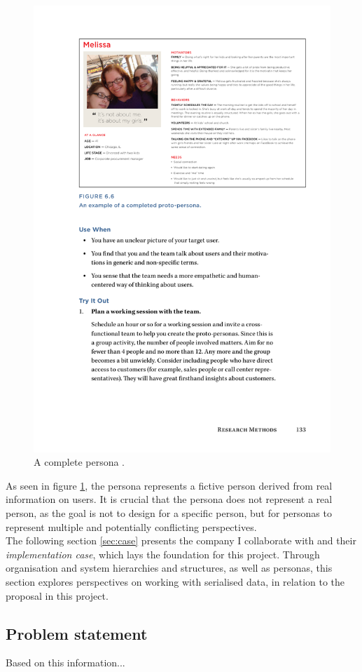 \documentclass[../report.tex]{subfiles}
\begin{document}
\begin{figure}[H]
\centering
\includegraphics[width=0.9\linewidth]{figures/persona.pdf}
\caption{A complete persona \cite[p. 133]{buley2013user}.}
\label{fig:persona}
\end{figure}

As seen in figure \ref{fig:persona}, the persona represents a fictive person derived from real information on users. It is crucial that the persona does not represent a real person, as the goal is not to design for a specific person, but for personas to represent multiple and potentially conflicting perspectives. \\

The following section \ref{sec:case} presents the company I collaborate with and their \textit{implementation case}, which lays the foundation for this project. Through organisation and system hierarchies and structures, as well as personas, this section explores perspectives on working with serialised data, in relation to the proposal in this project.

\subsection{Problem statement}

Based on this information...
\end{document}
